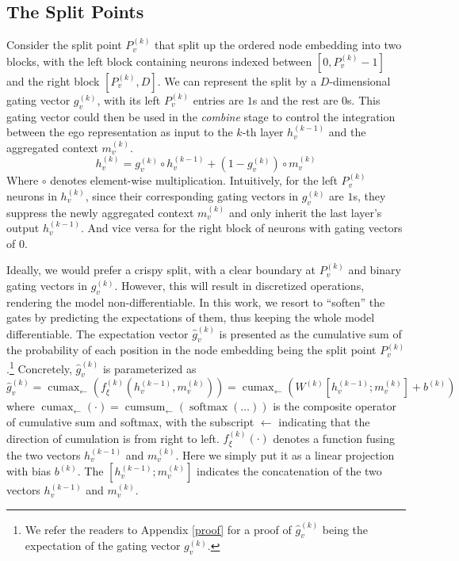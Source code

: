 \documentclass{article}
\begin{document}
\subsection{The Split Points}
Consider the split point $P_{v}^{(k)}$ that split up the ordered node embedding into two blocks, with the left block containing neurons indexed between $[0, P_{v}^{(k)}-1]$ and the right block $[P_{v}^{(k)}, D]$. We can represent the split by a $D$-dimensional gating vector $g_v^{(k)}$, with its left $P_{v}^{(k)}$ entries are $1$s and the rest are $0$s. This gating vector could then be used in the \textit{combine} stage to control the integration between the ego representation as input to the $k$-th layer $h_{v}^{(k-1)}$ and the aggregated context $m_{v}^{(k)}$.
\begin{equation}
h_{v}^{(k)}=g_{v}^{(k)} \circ h_{v}^{(k-1)} + \left(1-g_{v}^{(k)}\right) \circ m_{v}^{(k)}
\end{equation}
Where $\circ$ denotes element-wise multiplication. Intuitively, for the left $P_{v}^{(k)}$ neurons in $h_{v}^{(k)}$, since their corresponding gating vectors in $g_{v}^{(k)}$ are $1$s, they suppress the newly aggregated context $m_{v}^{(k)}$ and only inherit the last layer's output $h_{v}^{(k-1)}$. And vice versa for the right block of neurons with gating vectors of $0$.

Ideally, we would prefer a crispy split, with a clear boundary at $P_{v}^{(k)}$ and binary gating vectors in $g_{v}^{(k)}$. However, this will result in discretized operations, rendering the model non-differentiable. In this work, we resort to ``soften'' the gates by predicting the expectations of them, thus keeping the whole model differentiable. The expectation vector $\hat{g}_{v}^{(k)}$ is presented as the cumulative sum of the probability of each position in the node embedding being the split point $P_{v}^{(k)}$.\footnote{We refer the readers to Appendix \ref{proof} for a proof of $\hat{g}_{v}^{(k)}$ being the expectation of the gating vector $g_{v}^{(k)}$.} Concretely, $\hat{g}_{v}^{(k)}$ is parameterized as
\begin{equation}
\label{eq.ordered_gating}
\hat{g}_{v}^{(k)} = \operatorname{cumax}_{\leftarrow}\left( f_{\xi}^{(k)} \left( h_{v}^{(k-1)}, m_{v}^{(k)} \right) \right) = \operatorname{cumax}_{\leftarrow}\left( W^{(k)} \left[ h_{v}^{(k-1)}; m_{v}^{(k)} \right]+b^{(k)} \right)
\end{equation}
where $\operatorname{cumax}_{\leftarrow}(\cdot)=\operatorname{cumsum}_{\leftarrow}(\operatorname{softmax}(\ldots))$ is the composite operator of cumulative sum and softmax, with the subscript $\leftarrow$ indicating that the direction of cumulation is from right to left. $f_{\xi}^{(k)}(\cdot)$ denotes a function fusing the two vectors $h_{v}^{(k-1)}$ and $m_{v}^{(k)}$. Here we simply put it as a linear projection with bias $b^{(k)}$. The $\left[ h_{v}^{(k-1)}; m_{v}^{(k)} \right]$ indicates the concatenation of the two vectors $h_{v}^{(k-1)}$ and $m_{v}^{(k)}$.
\end{document}
